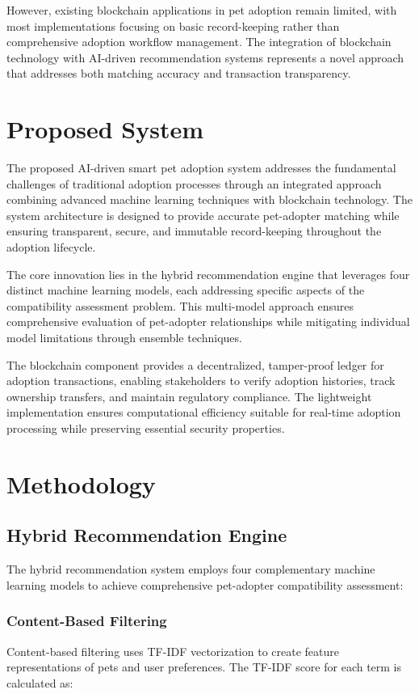 \documentclass[conference]{IEEEtran}
\begin{document}
However, existing blockchain applications in pet adoption remain limited, with most implementations focusing on basic record-keeping rather than comprehensive adoption workflow management. The integration of blockchain technology with AI-driven recommendation systems represents a novel approach that addresses both matching accuracy and transaction transparency.

\section{Proposed System}

The proposed AI-driven smart pet adoption system addresses the fundamental challenges of traditional adoption processes through an integrated approach combining advanced machine learning techniques with blockchain technology. The system architecture is designed to provide accurate pet-adopter matching while ensuring transparent, secure, and immutable record-keeping throughout the adoption lifecycle.

The core innovation lies in the hybrid recommendation engine that leverages four distinct machine learning models, each addressing specific aspects of the compatibility assessment problem. This multi-model approach ensures comprehensive evaluation of pet-adopter relationships while mitigating individual model limitations through ensemble techniques.

The blockchain component provides a decentralized, tamper-proof ledger for adoption transactions, enabling stakeholders to verify adoption histories, track ownership transfers, and maintain regulatory compliance. The lightweight implementation ensures computational efficiency suitable for real-time adoption processing while preserving essential security properties.

\section{Methodology}

\subsection{Hybrid Recommendation Engine}

The hybrid recommendation system employs four complementary machine learning models to achieve comprehensive pet-adopter compatibility assessment:

\subsubsection{Content-Based Filtering}
Content-based filtering uses TF-IDF vectorization to create feature representations of pets and user preferences. The TF-IDF score for each term is calculated as:
\end{document}
